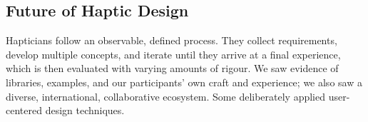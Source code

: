 \subsection{Future of Haptic Design}
%

\noindent Hapticians follow an observable, defined process.
They collect requirements, develop multiple concepts, and iterate until they arrive at a final experience, which is then evaluated with varying amounts of rigour.
We saw evidence of libraries, examples, and our participants' own craft and experience; we also saw a diverse, international, collaborative ecosystem.
Some deliberately applied user-centered design techniques.

